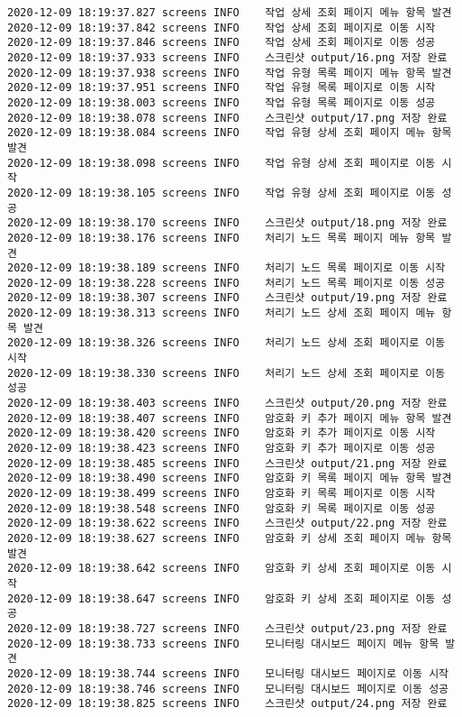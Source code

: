 \begin{Verbatim}[fontsize=\tiny, breaklines=true, breakanywhere=true]
2020-12-09 18:19:37.827 screens	INFO	작업 상세 조회 페이지 메뉴 항목 발견
2020-12-09 18:19:37.842 screens	INFO	작업 상세 조회 페이지로 이동 시작
2020-12-09 18:19:37.846 screens	INFO	작업 상세 조회 페이지로 이동 성공
2020-12-09 18:19:37.933 screens	INFO	스크린샷 output/16.png 저장 완료
2020-12-09 18:19:37.938 screens	INFO	작업 유형 목록 페이지 메뉴 항목 발견
2020-12-09 18:19:37.951 screens	INFO	작업 유형 목록 페이지로 이동 시작
2020-12-09 18:19:38.003 screens	INFO	작업 유형 목록 페이지로 이동 성공
2020-12-09 18:19:38.078 screens	INFO	스크린샷 output/17.png 저장 완료
2020-12-09 18:19:38.084 screens	INFO	작업 유형 상세 조회 페이지 메뉴 항목 발견
2020-12-09 18:19:38.098 screens	INFO	작업 유형 상세 조회 페이지로 이동 시작
2020-12-09 18:19:38.105 screens	INFO	작업 유형 상세 조회 페이지로 이동 성공
2020-12-09 18:19:38.170 screens	INFO	스크린샷 output/18.png 저장 완료
2020-12-09 18:19:38.176 screens	INFO	처리기 노드 목록 페이지 메뉴 항목 발견
2020-12-09 18:19:38.189 screens	INFO	처리기 노드 목록 페이지로 이동 시작
2020-12-09 18:19:38.228 screens	INFO	처리기 노드 목록 페이지로 이동 성공
2020-12-09 18:19:38.307 screens	INFO	스크린샷 output/19.png 저장 완료
2020-12-09 18:19:38.313 screens	INFO	처리기 노드 상세 조회 페이지 메뉴 항목 발견
2020-12-09 18:19:38.326 screens	INFO	처리기 노드 상세 조회 페이지로 이동 시작
2020-12-09 18:19:38.330 screens	INFO	처리기 노드 상세 조회 페이지로 이동 성공
2020-12-09 18:19:38.403 screens	INFO	스크린샷 output/20.png 저장 완료
2020-12-09 18:19:38.407 screens	INFO	암호화 키 추가 페이지 메뉴 항목 발견
2020-12-09 18:19:38.420 screens	INFO	암호화 키 추가 페이지로 이동 시작
2020-12-09 18:19:38.423 screens	INFO	암호화 키 추가 페이지로 이동 성공
2020-12-09 18:19:38.485 screens	INFO	스크린샷 output/21.png 저장 완료
2020-12-09 18:19:38.490 screens	INFO	암호화 키 목록 페이지 메뉴 항목 발견
2020-12-09 18:19:38.499 screens	INFO	암호화 키 목록 페이지로 이동 시작
2020-12-09 18:19:38.548 screens	INFO	암호화 키 목록 페이지로 이동 성공
2020-12-09 18:19:38.622 screens	INFO	스크린샷 output/22.png 저장 완료
2020-12-09 18:19:38.627 screens	INFO	암호화 키 상세 조회 페이지 메뉴 항목 발견
2020-12-09 18:19:38.642 screens	INFO	암호화 키 상세 조회 페이지로 이동 시작
2020-12-09 18:19:38.647 screens	INFO	암호화 키 상세 조회 페이지로 이동 성공
2020-12-09 18:19:38.727 screens	INFO	스크린샷 output/23.png 저장 완료
2020-12-09 18:19:38.733 screens	INFO	모니터링 대시보드 페이지 메뉴 항목 발견
2020-12-09 18:19:38.744 screens	INFO	모니터링 대시보드 페이지로 이동 시작
2020-12-09 18:19:38.746 screens	INFO	모니터링 대시보드 페이지로 이동 성공
2020-12-09 18:19:38.825 screens	INFO	스크린샷 output/24.png 저장 완료

\end{Verbatim}
